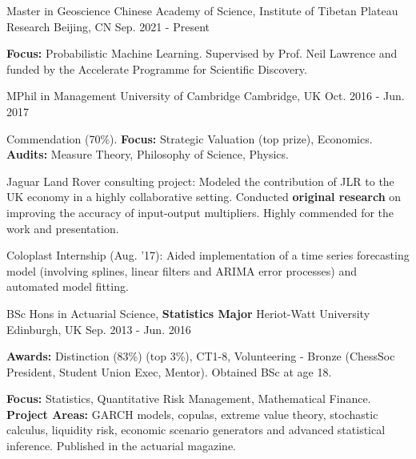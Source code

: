 

\begin{cventries}

  \cventry
    {Master in Geoscience} %
    {Chinese Academy of Science, Institute of Tibetan Plateau Research} %
    {Beijing, CN} %
    {Sep. 2021 - Present} %
    {
      \begin{cvitems} %
        \item {\textbf{Focus:} Probabilistic Machine Learning. Supervised by Prof. Neil Lawrence and funded by the Accelerate Programme for Scientific Discovery.}
      \end{cvitems}
    }

  \cventry
    {MPhil in Management} %
    {University of Cambridge} %
    {Cambridge, UK} %
    {Oct. 2016 - Jun. 2017} %
    {
      \begin{cvitems} %
        \item {Commendation (70\%). \textbf{Focus:} Strategic Valuation (top prize), Economics. \textbf{Audits:} Measure Theory, Philosophy of Science, Physics.}
        \item {Jaguar Land Rover consulting project: Modeled the contribution of JLR to the UK economy in a highly collaborative setting. Conducted \textbf{original research} on improving the accuracy of input-output multipliers. Highly commended for the work and presentation.}
        \item {Coloplast Internship (Aug. '17): Aided implementation of a time series forecasting model (involving splines, linear filters and ARIMA error processes) and automated model fitting.}
      \end{cvitems}
    }

  \cventry
    {BSc Hons in Actuarial Science, \textbf{Statistics Major}} %
    {Heriot-Watt University} %
    {Edinburgh, UK} %
    {Sep. 2013 - Jun. 2016} %
    {
      \begin{cvitems} %
        \item {\textbf{Awards:} Distinction (83\%) (top 3\%), CT1-8, Volunteering - Bronze (ChessSoc President, Student Union Exec, Mentor). Obtained BSc at age 18.}
        \item {\textbf{Focus:} Statistics, Quantitative Risk Management, Mathematical Finance. \textbf{Project Areas:} GARCH models, copulas, extreme value theory, stochastic calculus, liquidity risk, economic scenario generators and advanced statistical inference. Published in the actuarial magazine.}
      \end{cvitems}
    }

  \vspace{-5mm}

\end{cventries}
